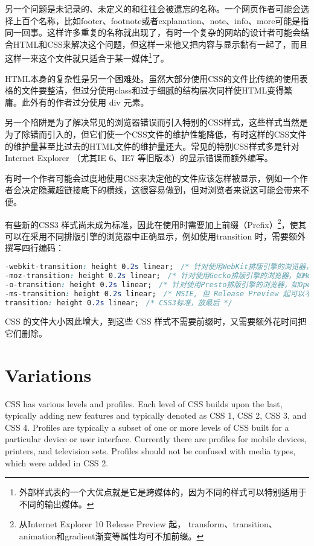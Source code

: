 另一个问题是未记录的、未定义的和往往会被遗忘的名称。一个网页作者可能会选择上百个名称，比如footer、footnote或者explanation、note、info、more可能是指同一回事。这样许多重复的名称就出现了，有时一个复杂的网站的设计者可能会结合HTML和CSS来解决这个问题，但这样一来他又把内容与显示黏有一起了，而且这样一来这个文件就只适合于某一媒体\footnote{外部样式表的一个大优点就是它是跨媒体的，因为不同的样式可以特别适用于不同的输出媒体。}了。


HTML本身的复杂性是另一个困难处。虽然大部分使用CSS的文件比传统的使用表格的文件要整洁，但过分使用class和过于细腻的结构层次同样使HTML变得繁庸。此外有的作者过分使用 div 元素。


另一个陷阱是为了解决常见的浏览器错误而引入特别的CSS样式，这些样式当然是为了除错而引入的，但它们使一个CSS文件的维护性能降低，有时这样的CSS文件的维护量甚至比过去的HTML文件的维护量还大。常见的特别CSS样式多是针对Internet Explorer （尤其IE 6、IE7 等旧版本）的显示错误而额外编写。

有时一个作者可能会过度地使用CSS来决定他的文件应该怎样被显示，例如一个作者会决定隐藏超链接底下的横线，这很容易做到，但对浏览者来说这可能会带来不便。


有些新的CSS3 样式尚未成为标准，因此在使用时需要加上前缀（Prefix）\footnote{从Internet Explorer 10 Release Preview 起， transform、transition、animation和gradient渐变等属性均可不加前缀。}，使其可以在采用不同排版引擎的浏览器中正确显示，例如使用transition 时，需要额外撰写四行编码：


\begin{lstlisting}[language=CSS]
-webkit-transition: height 0.2s linear;　/* 针对使用WebKit排版引擎的浏览器，如Google Chrome、Apple Safari */
-moz-transition: height 0.2s linear;　/* 针对使用Gecko排版引擎的浏览器，如Mozilla Firefox */
-o-transition: height 0.2s linear;　/* 针对使用Presto排版引擎的浏览器，如Opera */
-ms-transition: height 0.2s linear;　/* MSIE, 但 Release Preview 起可以不用前缀 */
transition: height 0.2s linear;　/* CSS3标准，放最后 */
\end{lstlisting}

CSS 的文件大小因此增大，到这些 CSS 样式不需要前缀时，又需要额外花时间把它们删除。




\section{Variations}


CSS has various levels and profiles. Each level of CSS builds upon the last, typically adding new features and typically denoted as CSS 1, CSS 2, CSS 3, and CSS 4. Profiles are typically a subset of one or more levels of CSS built for a particular device or user interface. Currently there are profiles for mobile devices, printers, and television sets. Profiles should not be confused with media types, which were added in CSS 2.




